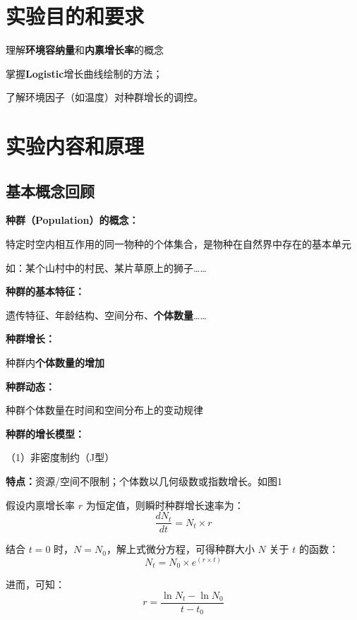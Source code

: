 \documentclass[10.5pt]{config}
\date{2025.9.24}
\begin{document}
\makeheader %


\section{实验目的和要求}

理解\textbf{环境容纳量}和\textbf{内禀增长率}的概念

掌握\textbf{Logistic}增长曲线绘制的方法；

了解环境因子（如温度）对种群增长的调控。

\section{实验内容和原理}

\subsection{基本概念回顾}

\textbf{种群（Population）的概念：}

特定时空内相互作用的同一物种的个体集合，是物种在自然界中存在的基本单元

如：某个山村中的村民、某片草原上的狮子……

\textbf{种群的基本特征：}

遗传特征、年龄结构、空间分布、\textbf{个体数量}……

\textbf{种群增长：}

种群内\textbf{个体数量的增加}

\textbf{种群动态：}

种群个体数量在时间和空间分布上的变动规律

\textbf{种群的增长模型：}

（1）非密度制约（J型）

\textbf{特点：}资源/空间不限制；个体数以几何级数或指数增长。如图1

假设内禀增长率 $r$ 为恒定值，则瞬时种群增长速率为：
\begin{equation}
\frac{dN_t}{dt} = N_t \times r
\end{equation}

结合 $t=0$ 时，$N=N_0$，解上式微分方程，可得种群大小 $N$ 关于 $t$ 的函数：
\begin{equation}
N_t = N_0 \times e^{(r \times t)}
\end{equation}

进而，可知：
\begin{equation}
r = \frac{\ln N_t - \ln N_0}{t - t_0}
\end{equation}
\end{document}
